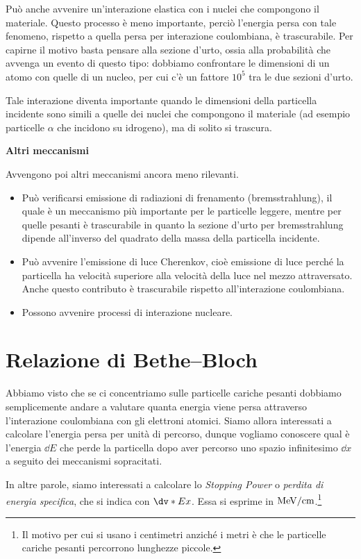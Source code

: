 Può anche avvenire un'interazione elastica con i nuclei che compongono il materiale. Questo processo è meno importante, perciò l'energia persa con tale fenomeno, rispetto a quella persa per interazione coulombiana, è trascurabile. Per capirne il motivo basta pensare alla sezione d'urto, ossia alla probabilità che avvenga un evento di questo tipo: dobbiamo confrontare le dimensioni di un atomo con quelle di un nucleo, per cui c'è un fattore $10^5$ tra le due sezioni d'urto.

Tale interazione diventa importante quando le dimensioni della particella incidente sono simili a quelle dei nuclei che compongono il materiale (ad esempio particelle $\alpha$ che incidono su idrogeno), ma di solito si trascura.

\vspace{0.2cm}\textbf{Altri meccanismi}

Avvengono poi altri meccanismi ancora meno rilevanti.
\begin{itemize}
    \item Può verificarsi emissione di radiazioni di frenamento (bremsstrahlung), il quale è un meccanismo più importante per le particelle leggere, mentre per quelle pesanti è trascurabile in quanto la sezione d'urto per bremsstrahlung dipende all'inverso del quadrato della massa della particella incidente.
    \item Può avvenire l'emissione di luce Cherenkov, cioè emissione di luce perché la particella ha velocità superiore alla velocità della luce nel mezzo attraversato. Anche questo contributo è trascurabile rispetto all'interazione coulombiana.
    \item Possono avvenire processi di interazione nucleare.
\end{itemize}

\section{Relazione di Bethe--Bloch}
Abbiamo visto che se ci concentriamo sulle particelle cariche pesanti dobbiamo semplicemente andare a valutare quanta energia viene persa attraverso l'interazione coulombiana con gli elettroni atomici. Siamo allora interessati a calcolare l'energia persa per unità di percorso, dunque vogliamo conoscere qual è l'energia $\dd{E}$ che perde la particella dopo aver percorso uno spazio infinitesimo $\dd{x}$ a seguito dei meccanismi sopracitati.

In altre parole, siamo interessati a calcolare lo \textit{Stopping Power} o \textit{perdita di energia specifica}, che si indica con $\dv*{E}{x}$. Essa si esprime in $\rm MeV/cm$.\footnote{Il motivo per cui si usano i centimetri anziché i metri è che le particelle cariche pesanti percorrono lunghezze piccole.}

